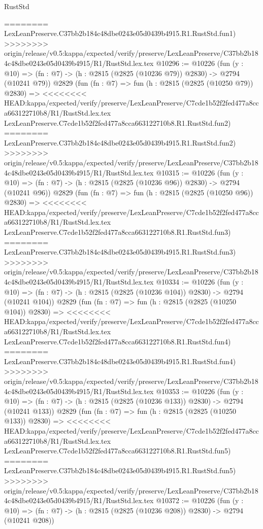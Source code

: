 \begin{lexlean}{RustStd}
\begin{coremodule}
{\begin{coremodule}
{{{{{{{{{{{{{{{========
    LexLeanPreserve.C37bb2b184c48dbe0243e05d0439b4915.R1.RustStd.fun1)
>>>>>>>> origin/release/v0.5:kappa/expected/verify/preserve/LexLeanPreserve/C37bb2b184c48dbe0243e05d0439b4915/R1/RustStd.lex.tex
@10296 := @10226
    (fun (y : @10) => (fn : @7) -> (h : @2815 (@2825 (@10236 @79)) @2830) -> @2794 (@10241 @79))
    @2829
    (fun (fn : @7) =>
    fun (h : @2815 (@2825 (@10250 @79)) @2830) =>
<<<<<<<< HEAD:kappa/expected/verify/preserve/LexLeanPreserve/C7cde1b52f2fed477a8cca663122710b8/R1/RustStd.lex.tex
    LexLeanPreserve.C7cde1b52f2fed477a8cca663122710b8.R1.RustStd.fun2)
========
    LexLeanPreserve.C37bb2b184c48dbe0243e05d0439b4915.R1.RustStd.fun2)
>>>>>>>> origin/release/v0.5:kappa/expected/verify/preserve/LexLeanPreserve/C37bb2b184c48dbe0243e05d0439b4915/R1/RustStd.lex.tex
@10315 := @10226
    (fun (y : @10) => (fn : @7) -> (h : @2815 (@2825 (@10236 @96)) @2830) -> @2794 (@10241 @96))
    @2829
    (fun (fn : @7) =>
    fun (h : @2815 (@2825 (@10250 @96)) @2830) =>
<<<<<<<< HEAD:kappa/expected/verify/preserve/LexLeanPreserve/C7cde1b52f2fed477a8cca663122710b8/R1/RustStd.lex.tex
    LexLeanPreserve.C7cde1b52f2fed477a8cca663122710b8.R1.RustStd.fun3)
========
    LexLeanPreserve.C37bb2b184c48dbe0243e05d0439b4915.R1.RustStd.fun3)
>>>>>>>> origin/release/v0.5:kappa/expected/verify/preserve/LexLeanPreserve/C37bb2b184c48dbe0243e05d0439b4915/R1/RustStd.lex.tex
@10334 := @10226
    (fun (y : @10) => (fn : @7) -> (h : @2815 (@2825 (@10236 @104)) @2830) -> @2794 (@10241 @104))
    @2829
    (fun (fn : @7) =>
    fun (h : @2815 (@2825 (@10250 @104)) @2830) =>
<<<<<<<< HEAD:kappa/expected/verify/preserve/LexLeanPreserve/C7cde1b52f2fed477a8cca663122710b8/R1/RustStd.lex.tex
    LexLeanPreserve.C7cde1b52f2fed477a8cca663122710b8.R1.RustStd.fun4)
========
    LexLeanPreserve.C37bb2b184c48dbe0243e05d0439b4915.R1.RustStd.fun4)
>>>>>>>> origin/release/v0.5:kappa/expected/verify/preserve/LexLeanPreserve/C37bb2b184c48dbe0243e05d0439b4915/R1/RustStd.lex.tex
@10353 := @10226
    (fun (y : @10) => (fn : @7) -> (h : @2815 (@2825 (@10236 @133)) @2830) -> @2794 (@10241 @133))
    @2829
    (fun (fn : @7) =>
    fun (h : @2815 (@2825 (@10250 @133)) @2830) =>
<<<<<<<< HEAD:kappa/expected/verify/preserve/LexLeanPreserve/C7cde1b52f2fed477a8cca663122710b8/R1/RustStd.lex.tex
    LexLeanPreserve.C7cde1b52f2fed477a8cca663122710b8.R1.RustStd.fun5)
========
    LexLeanPreserve.C37bb2b184c48dbe0243e05d0439b4915.R1.RustStd.fun5)
>>>>>>>> origin/release/v0.5:kappa/expected/verify/preserve/LexLeanPreserve/C37bb2b184c48dbe0243e05d0439b4915/R1/RustStd.lex.tex
@10372 := @10226
    (fun (y : @10) => (fn : @7) -> (h : @2815 (@2825 (@10236 @208)) @2830) -> @2794 (@10241 @208))
}}}}}}}}}}}}}}}
\end{coremodule}}
\end{coremodule}
\end{lexlean}
